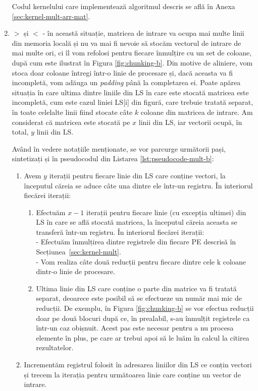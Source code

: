 \begin{enumerate}[label=\alph*., ref=\alph*]
  Codul kernelului care implementează algoritmul descris se află în Anexa
  \ref{sec:kernel-mult-arr-mat}.

  \item \label{enum:kernel-b}  $>$  și
   $<$  - în această situație,
  matricea de intrare va ocupa mai multe linii din memoria locală și nu va mai
  fi nevoie să stocăm vectorul de intrare de mai multe ori, ci îl vom refolosi
  pentru fiecare înmulțire cu un set de coloane, după cum este
  ilustrat în Figura \ref{fig:chunking-b}. Din motive de aliniere, vom stoca
  doar coloane întregi într-o linie de procesare și, dacă aceasta va fi
  incompletă, vom adăuga un \textit{padding} până la completarea ei. Poate
  apărea situația în care ultima dintre liniile din LS în care este stocată
  matricea este incompletă, cum este cazul liniei LS[i] din figură, care trebuie
  tratată separat, în toate celelalte linii fiind stocate câte $k$ coloane din
  matricea de intrare. Am considerat că matricea este stocată pe $x$ linii din LS,
  iar vectorii ocupă, în total, $y$ linii din LS.

  Având în vedere notațiile menționate, se vor parcurge următorii pași,
  sintetizați și în pseudocodul din Listarea \ref{lst:pseudocode-mult-b}:
  \begin{enumerate}[label=\arabic*., ref=\arabic*]
    \item Avem $y$ iterații pentru fiecare linie din LS care conține vectori, la
    începutul căreia se aduce câte una dintre ele într-un registru. În
    interiorul fiecărei iterații:
    \begin{enumerate}[label*=\arabic*., ref=\arabic*]
      \item Efectuăm $x-1$ iterații pentru fiecare linie (cu excepția ultimei) din
      LS în care se află stocată matricea, la începutul căreia aceasta se
      transferă într-un registru. În interiorul fiecărei iterații:\\
        - Efectuăm înmulțirea dintre registrele din fiecare PE descrisă în
        Secțiunea~\ref{sec:kernel-mult}. \\
        - Vom realiza câte două reducții pentru fiecare dintre cele k coloane
        dintr-o linie de procesare. 
      \item Ultima linie din LS care conține o parte din matrice va fi tratată
      separat, deoarece este posibil să se efectueze un număr mai mic de reducții.
      De exemplu, în Figura \ref{fig:chunking-b} se vor efectua reducții doar pe
      două blocuri după ce, în prealabil, s-au înmulțit registrele ca într-un caz
      obișnuit. Acest pas este necesar pentru a nu procesa elemente în plus,
      pe care ar trebui apoi să le luăm în calcul la citirea rezultatelor.
    \end{enumerate}
    \item Incrementăm registrul folosit în adresarea liniilor din LS ce conțin
    vectori și trecem la iterația pentru următoarea linie care conține un vector
    de intrare.
  \end{enumerate}
  

\end{enumerate}

